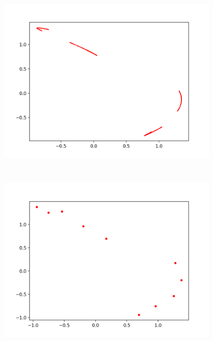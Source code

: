 \documentclass[12pt]{article}
\theoremstyle{plain}
\begin{document}
\begin{figure}[H]
\begin{minipage}[c][0.32\width]{0.32\textwidth}
   \includegraphics[width=\textwidth]{figure/section2/Henon-attractor-1*0-0*4.png}
\end{minipage}
\\[12ex]
\begin{minipage}[c][0.32\width]{0.32\textwidth}
   \centering
   \includegraphics[width=\textwidth]{figure/section2/Henon-attractor-1*0293-0*4.png}
\end{minipage}
\begin{minipage}[c][0.32\width]{0.32\textwidth}
   \centering

\end{minipage}
\end{figure}
\end{document}
